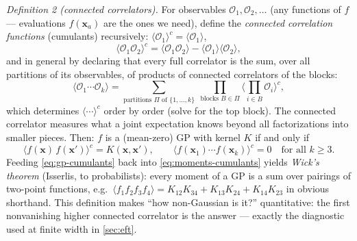 \documentclass[11pt]{article}
\newcommand{\bv}[1]{\boldsymbol{#1}}
\begin{document}
\emph{Definition 2 (connected correlators).} For observables
$\mathcal{O}_1, \mathcal{O}_2, \dots$ (any functions of $f$ ---
evaluations $f(\bv{x}_a)$ are the ones we need), define the
\emph{connected correlation functions} (cumulants) recursively:
$\langle \mathcal{O}_1 \rangle^c = \langle \mathcal{O}_1 \rangle$,
\begin{equation}
  \label{eq:connected-2}
  \langle \mathcal{O}_1 \mathcal{O}_2 \rangle^c
  = \langle \mathcal{O}_1 \mathcal{O}_2 \rangle
  - \langle \mathcal{O}_1 \rangle \langle \mathcal{O}_2 \rangle,
\end{equation}
and in general by declaring that every full correlator is the sum, over
all partitions of its observables, of products of connected correlators of
the blocks:
\begin{equation}
  \label{eq:moments-cumulants}
  \langle \mathcal{O}_1 \cdots \mathcal{O}_k \rangle
  = \sum_{\text{partitions } \Pi \text{ of } \{1,\dots,k\}}
  \;\prod_{\text{blocks } B \in \Pi}
  \bigl\langle \textstyle\prod_{i \in B} \mathcal{O}_i
  \bigr\rangle^{c},
\end{equation}
which determines $\langle \cdots \rangle^c$ order by order (solve for the
top block). The connected correlator measures what a joint expectation
knows beyond all factorizations into smaller pieces. Then: $f$ is a
(mean-zero) GP with kernel $K$ if and only if
\begin{equation}
  \label{eq:gp-cumulants}
  \langle f(\bv{x})\, f(\bv{x}') \rangle^c = K(\bv{x},\bv{x}'),
  \qquad
  \langle f(\bv{x}_1) \cdots f(\bv{x}_k) \rangle^c = 0
  \quad \text{for all } k \ge 3 .
\end{equation}
Feeding \cref{eq:gp-cumulants} back into \cref{eq:moments-cumulants}
yields \emph{Wick's theorem} (Isserlis, to probabilists): every moment of
a GP is a sum over pairings of two-point functions, e.g.\
$\langle f_1 f_2 f_3 f_4 \rangle = K_{12}K_{34} + K_{13}K_{24} +
K_{14}K_{23}$ in obvious shorthand. This definition makes ``how
non-Gaussian is it?'' quantitative: the first nonvanishing higher
connected correlator is the answer --- exactly the diagnostic used at
finite width in \cref{sec:eft}.
\end{document}
